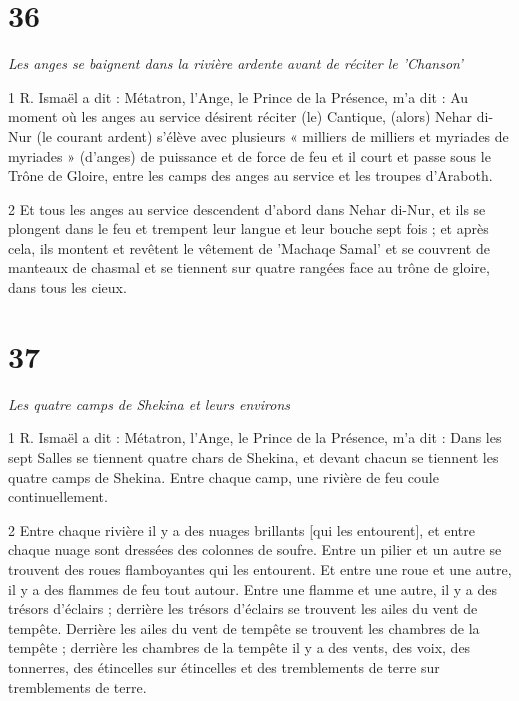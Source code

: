 \chapter{36}

\par \textit{Les anges se baignent dans la rivière ardente avant de réciter le 'Chanson'}

\par 1 R. Ismaël a dit : Métatron, l'Ange, le Prince de la Présence, m'a dit : Au moment où les anges au service désirent réciter (le) Cantique, (alors) Nehar di-Nur (le courant ardent) s'élève avec plusieurs « milliers de milliers et myriades de myriades » (d'anges) de puissance et de force de feu et il court et passe sous le Trône de Gloire, entre les camps des anges au service et les troupes d'Araboth.

\par 2 Et tous les anges au service descendent d'abord dans Nehar di-Nur, et ils se plongent dans le feu et trempent leur langue et leur bouche sept fois ; et après cela, ils montent et revêtent le vêtement de 'Machaqe Samal' et se couvrent de manteaux de chasmal et se tiennent sur quatre rangées face au trône de gloire, dans tous les cieux.


\chapter{37}

\par \textit{Les quatre camps de Shekina et leurs environs}

\par 1 R. Ismaël a dit : Métatron, l'Ange, le Prince de la Présence, m'a dit : Dans les sept Salles se tiennent quatre chars de Shekina, et devant chacun se tiennent les quatre camps de Shekina. Entre chaque camp, une rivière de feu coule continuellement.

\par 2 Entre chaque rivière il y a des nuages ​​brillants [qui les entourent], et entre chaque nuage sont dressées des colonnes de soufre. Entre un pilier et un autre se trouvent des roues flamboyantes qui les entourent. Et entre une roue et une autre, il y a des flammes de feu tout autour. Entre une flamme et une autre, il y a des trésors d'éclairs ; derrière les trésors d'éclairs se trouvent les ailes du vent de tempête. Derrière les ailes du vent de tempête se trouvent les chambres de la tempête ; derrière les chambres de la tempête il y a des vents, des voix, des tonnerres, des étincelles sur étincelles et des tremblements de terre sur tremblements de terre.


